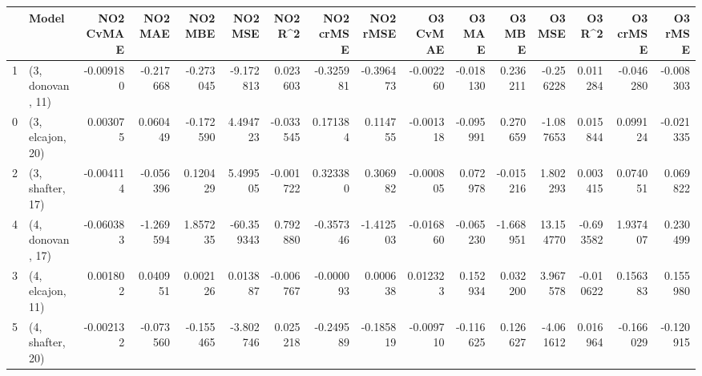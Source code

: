 \begin{tabular}{llrrrrrrrrrrrrrr}
\toprule
{} &             Model &  NO2 CvMAE &   NO2 MAE &   NO2 MBE &    NO2 MSE &   NO2 R\textasciicircum2 &  NO2 crMSE &  NO2 rMSE &  O3 CvMAE &    O3 MAE &    O3 MBE &     O3 MSE &    O3 R\textasciicircum2 &  O3 crMSE &   O3 rMSE \\
\midrule
1 &  (3, donovan, 11) &  -0.009180 & -0.217668 & -0.273045 &  -9.172813 &  0.023603 &  -0.325981 & -0.396473 & -0.002260 & -0.018130 &  0.236211 &  -0.256228 &  0.011284 & -0.046280 & -0.008303 \\
0 &  (3, elcajon, 20) &   0.003075 &  0.060449 & -0.172590 &   4.494723 & -0.033545 &   0.171384 &  0.114755 & -0.001318 & -0.095991 &  0.270659 &  -1.087653 &  0.015844 &  0.099124 & -0.021335 \\
2 &  (3, shafter, 17) &  -0.004114 & -0.056396 &  0.120429 &   5.499505 & -0.001722 &   0.323380 &  0.306982 & -0.000805 &  0.072978 & -0.015216 &   1.802293 &  0.003415 &  0.074051 &  0.069822 \\
4 &  (4, donovan, 17) &  -0.060383 & -1.269594 &  1.857235 & -60.359343 &  0.792880 &  -0.357346 & -1.412503 & -0.016860 & -0.065230 & -1.668951 &  13.154770 & -0.693582 &  1.937407 &  0.230499 \\
3 &  (4, elcajon, 11) &   0.001802 &  0.040951 &  0.002126 &   0.013887 & -0.006767 &  -0.000093 &  0.000638 &  0.012323 &  0.152934 &  0.032200 &   3.967578 & -0.010622 &  0.156383 &  0.155980 \\
5 &  (4, shafter, 20) &  -0.002132 & -0.073560 & -0.155465 &  -3.802746 &  0.025218 &  -0.249589 & -0.185819 & -0.009710 & -0.116625 &  0.126627 &  -4.061612 &  0.016964 & -0.166029 & -0.120915 \\
\bottomrule
\end{tabular}

